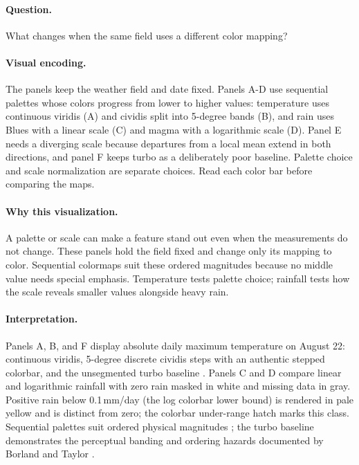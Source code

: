 \documentclass[conference,a4paper]{IEEEtran}
\begin{document}
\paragraph{Question.} What changes when the same field uses a different color mapping?



\paragraph{Visual encoding.} The panels keep the weather field and date fixed. Panels A-D use sequential palettes whose colors progress from lower to higher values: temperature uses continuous viridis (A) and cividis split into 5-degree bands (B), and rain uses Blues with a linear scale (C) and magma with a logarithmic scale (D). Panel E needs a diverging scale because departures from a local mean extend in both directions, and panel F keeps turbo as a deliberately poor baseline. Palette choice and scale normalization are separate choices. Read each color bar before comparing the maps.



\paragraph{Why this visualization.} A palette or scale can make a feature stand out even when the measurements do not change. These panels hold the field fixed and change only its mapping to color. Sequential colormaps suit these ordered magnitudes because no middle value needs special emphasis. Temperature tests palette choice; rainfall tests how the scale reveals smaller values alongside heavy rain.



\paragraph{Interpretation.} Panels A, B, and F display absolute daily maximum temperature on August 22: continuous viridis, 5-degree discrete cividis steps with an authentic stepped colorbar, and the unsegmented turbo baseline \cite{ref15}. Panels C and D compare linear and logarithmic rainfall with zero rain masked in white and missing data in gray. Positive rain below 0.1\,mm/day (the log colorbar lower bound) is rendered in pale yellow and is distinct from zero; the colorbar under-range hatch marks this class. Sequential palettes suit ordered physical magnitudes \cite{ref7}; the turbo baseline demonstrates the perceptual banding and ordering hazards documented by Borland and Taylor \cite{ref15}.
\end{document}
